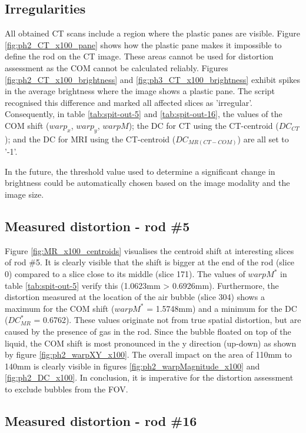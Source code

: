 \subsection{Irregularities}
All obtained CT scans include a region where the plastic panes are visible.
Figure \ref{fig:ph2_CT_x100_pane} shows how the plastic pane makes it impossible to define the rod on the CT image.
These areas cannot be used for distortion assessment as the COM cannot be calculated reliably.
Figures \ref{fig:ph2_CT_x100_brightness} and \ref{fig:ph3_CT_x100_brightness} exhibit spikes in the average brightness where the image shows a plastic pane.
The script recognised this difference and marked all affected slices as 'irregular'.
Consequently, in table \ref{tab:spit-out-5} and \ref{tab:spit-out-16}, the values of the COM shift ($warp_x$, $warp_y$, $warpM$); the DC for CT using the CT-centroid ($DC_{CT}$); and the DC for MRI using the CT-centroid ($DC_{MR(CT-COM)}$) are all set to '-1'.

In the future, the threshold value used to determine a significant change in brightness could be automatically chosen based on the image modality and the image size.

\subsection{Measured distortion - rod \#5}

Figure \ref{fig:MR_x100_centroids} visualises the centroid shift at interesting slices of rod \#5.
It is clearly visible that the shift is bigger at the end of the rod (slice 0) compared to a slice close to its middle (slice 171).
The values of $warpM^*$ in table \ref{tab:spit-out-5} verify this (1.0623mm > 0.6926mm).
Furthermore, the distortion measured at the location of the air bubble (slice 304) shows a maximum for the COM shift ($warpM^*$ = 1.5748mm) and a minimum for the DC ($DC^*_{MR}$ = 0.6762).
These values originate not from true spatial distortion, but are caused by the presence of gas in the rod.
Since the bubble floated on top of the liquid, the COM shift is most pronounced in the y direction (up-down) as shown by figure \ref{fig:ph2_warpXY_x100}.
The overall impact on the area of 110mm to 140mm is clearly visible in figures \ref{fig:ph2_warpMagnitude_x100} and \ref{fig:ph2_DC_x100}.
In conclusion, it is imperative for the distortion assessment to exclude bubbles from the FOV.

\subsection{Measured distortion - rod \#16}

